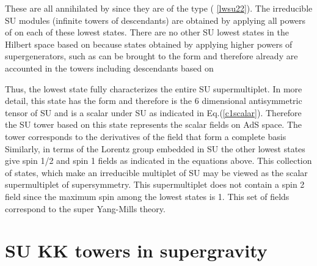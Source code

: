 \documentclass[a4paper,aps,preprint,nofootinbib]{revtex4}
\begin{document}
These are all annihilated by \coordHE{} since they are of the type (%
\ref{lwsu22}). The irreducible SU\coordHE{} modules (infinite
towers of descendants) are obtained by applying all powers of \coordHE{} on each of these lowest states. There are no other SU\coordHE{} lowest states in the Hilbert space based on \coordHE{} because states obtained by applying higher powers of
supergenerators, such as \coordHE{} can be brought to the form \coordHE{} and therefore already are accounted in the
towers including descendants based on \coordHE{}

Thus, the lowest state \coordHE{} fully characterizes the entire SU\coordHE{} supermultiplet. In more detail, this state has the
form \coordHE{} and therefore is the 6
dimensional antisymmetric tensor of SU\myHighlight{$\left( 4\right) ,$}\coordHE{} and is a scalar
under SU\coordHE{} as indicated in Eq.(\ref{c1scalar}). Therefore
the SU\coordHE{} tower based on this state represents the scalar
fields \myHighlight{$\phi^{\lbrack a_{1}a_{2}]}\left( x^{\mu},u\right) $}\coordHE{} on AdS space.
The tower corresponds to the derivatives of the field that form a complete
basis\coordHE{} Similarly, in terms of the Lorentz group embedded in SU\coordHE{} the other lowest states give spin 1/2 and spin 1 fields as
indicated in the equations above. This collection of states, which make an
irreducible multiplet of SU\coordHE{} may be viewed as the
scalar supermultiplet of \coordHE{} supersymmetry. This supermultiplet does not
contain a spin 2 field since the maximum spin among the lowest states is 1.
This set of fields correspond to the super Yang-Mills theory.

\section{SU\coordHE{} KK towers in supergravity}
\end{document}
